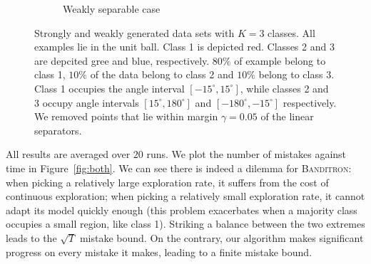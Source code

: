 \begin{figure}[h]
\begin{subfigure}[b]{0.23\textwidth}
\caption{Weakly separable case}
\label{figure:weakly-separable-dataset}
\end{subfigure}
\vspace*{-0.2cm}
\caption{Strongly and weakly generated data sets with $K=3$ classes. All examples lie in
the unit ball. Class 1 is depicted red. Classes 2 and 3 are depcited gree and
blue, respectively. $80\%$ of example belong to class 1, $10\%$ of the data
belong to class 2 and $10\%$ belong to class 3. Class 1 occupies the angle
interval $[-15^\circ, 15^\circ]$, while classes 2 and 3 occupy angle intervals
$[15^\circ, 180^\circ]$ and $[-180^\circ, -15^\circ]$ respectively. We removed
points that lie within margin $\gamma=0.05$ of the linear separators.}
\label{figure:strongly-and-weakly-separable-datasets}
\end{figure}

All results are averaged over $20$ runs.
We plot the number of mistakes against time in Figure~\ref{fig:both}. We can see
there is indeed a dilemma for \textsc{Banditron}: when picking a relatively
large exploration rate, it suffers from the cost of continuous exploration; when
picking a relatively small exploration rate, it cannot adapt its model quickly
enough (this problem exacerbates when a majority class occupies a small region,
like class 1). Striking a balance between the two extremes leads to the
$\sqrt{T}$ mistake bound. On the contrary, our algorithm makes significant
progress on every mistake it makes, leading to a finite mistake bound.


